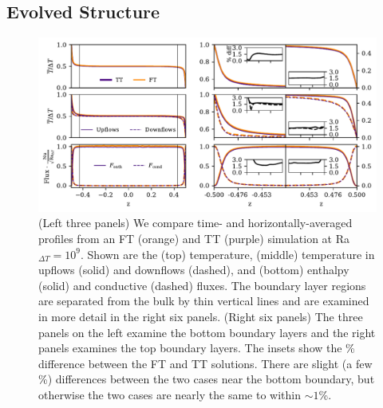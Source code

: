 \documentclass[aps, pre, onecolumn, nofootinbib, notitlepage, groupedaddress, amsfonts, amssymb, amsmath, longbibliography, superscriptaddress]{revtex4-1}
\begin{document}
\subsection{Evolved Structure}
\begin{figure}
\includegraphics[width=\textwidth]{./figs/rbc_1D_profiles.pdf}
\caption{ 
	(Left three panels) We compare time- and horizontally-averaged profiles from an FT (orange) and TT (purple) simulation at Ra$_{\Delta T} = 10^{9}$.
	Shown are the (top) temperature, (middle) temperature in upflows (solid) and downflows (dashed), and (bottom) enthalpy (solid) and conductive (dashed) fluxes.
	The boundary layer regions are separated from the bulk by thin vertical lines and are examined in more detail in the right six panels.
	(Right six panels) The three panels on the left examine the bottom boundary layers and the right panels examines the top boundary layers.
	The insets show the \% difference between the FT and TT solutions.
	There are slight (a few \%) differences between the two cases near the bottom boundary, but otherwise the two cases are nearly the same to within $\sim 1$\%.
\label{fig:rbc_1D_profiles} }
\vspace{0.5cm}
\end{figure}
\end{document}
